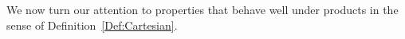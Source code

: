 \documentclass[a4paper]{article}
\theoremstyle{definition}
\newtheorem{defn}[lem]{Definition}
\DeclareMathOperator\Sym{Sym}
\DeclareMathOperator\diag{diag}
\newcommand*{\orbite}{\mathcal O}
\begin{document}
We now turn our attention to properties that behave well under products in the sense of Definition~\ref{Def:Cartesian}.
\end{document}
